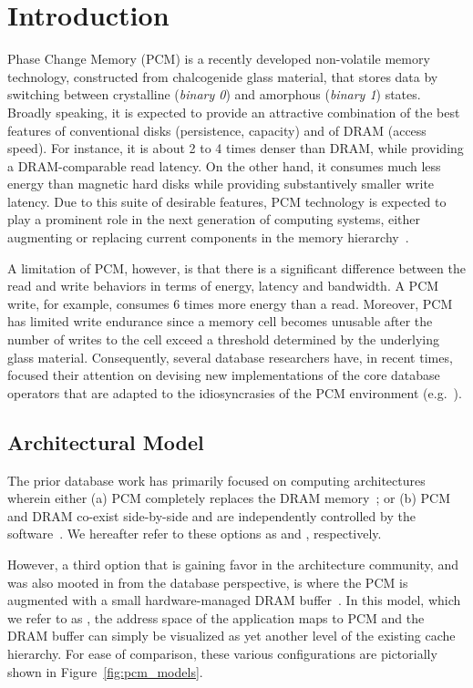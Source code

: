 \section{Introduction}
\label{sec:intro}
%
Phase Change Memory (PCM) is a recently developed non-volatile memory
technology, constructed from chalcogenide glass material, that stores
data by switching between crystalline (\emph{binary 0}) and amorphous 
(\emph{binary 1}) states. Broadly speaking, it is expected to provide an attractive
combination of the best features of conventional disks (persistence,
capacity) and of DRAM (access speed). For instance, it is
about 2 to 4 times denser than DRAM, while providing a DRAM-comparable
read latency.  On the other hand, it consumes much less energy
than magnetic hard disks while providing substantively smaller write latency. Due to this suite of  desirable features, PCM technology is
expected to play a prominent role in the next generation of computing
systems, either augmenting or replacing current components in the memory
hierarchy~\cite{qureshi,zhou,lee}.

A limitation of PCM, however, is that there is a significant difference
between the read and write behaviors in terms of energy, latency and
bandwidth. A PCM write, for example, consumes 6 times more energy than
a read. Moreover, PCM has limited write endurance since a memory cell
becomes unusable after the number of writes to the cell exceed a threshold
determined by the underlying glass material. Consequently, several database
researchers have, in recent times, focused their attention on devising
new implementations of the core database operators that are adapted to
the idiosyncrasies of the PCM environment (e.g.~\cite{chen,viglas}). 

\subsection*{Architectural Model}
The prior database work has primarily focused on computing
architectures wherein either (a) PCM completely replaces the
DRAM memory~\cite{chen}; or (b) PCM and DRAM co-exist side-by-side
and are independently controlled by the software~\cite{viglas}. We
hereafter refer to these options as {\bf \modelPcmRam{}} and
{\bf \modelExplicit{}}, respectively.

However, a third option that is gaining favor in the architecture
community, and was also mooted in \cite{chen} from the database
perspective, is where the PCM is augmented with a small hardware-managed
DRAM buffer~\cite{qureshi}. In this model, which we refer to as {\bf
\model{}}, the address space of the application maps to PCM and the DRAM
buffer can simply be visualized as yet another level of the existing
cache hierarchy.  For ease of comparison, these various configurations
are pictorially shown in Figure~\ref{fig:pcm_models}.

